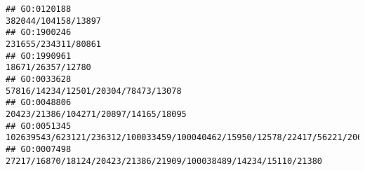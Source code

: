 \documentclass[
]{article}
\begin{document}
\begin{verbatim}
## GO:0120188                                                                                                                                                                                                                                                                                                                                                                                          382044/104158/13897
## GO:1900246                                                                                                                                                                                                                                                                                                                                                                                          231655/234311/80861
## GO:1990961                                                                                                                                                                                                                                                                                                                                                                                            18671/26357/12780
## GO:0033628                                                                                                                                                                                                                                                                                                                                                                          57816/14234/12501/20304/78473/13078
## GO:0048806                                                                                                                                                                                                                                                                                                                                                                         20423/21386/104271/20897/14165/18095
## GO:0051345                                                                                                                                                                                                                                                                        102639543/623121/236312/100033459/100040462/15950/12578/22417/56221/20617/11808/66113/76884/20304/18053/12775/50779/18095/54483/19876
## GO:0007498                                                                                                                                                                                                                                                                                                                                              27217/16870/18124/20423/21386/21909/100038489/14234/15110/21380

\end{verbatim}
\end{document}

